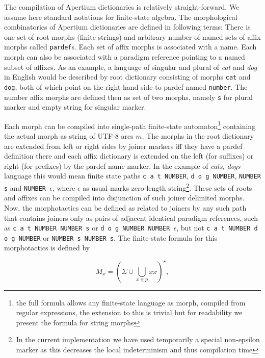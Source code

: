 \documentclass[a4paper]{article}
\begin{document}
The compilation of Apertium dictionaries is relatively straight-forward. We
assume here standard notations for finite-state algebra. The morphological
combinatorics of Apertium dictionaries are defined in following terms: There is
one set of root morphs (finite strings) and arbitrary number of named sets of
affix morphs called {\tt pardef}s. Each set of affix morphs is associated with a
name. Each morph can also be associated with a paradigm reference pointing to a
named subset of affixes. As an example, a language of singular and plural of
\emph{cat} and \emph{dog} in English would be described by root dictionary
consisting of morphs \texttt{cat} and \texttt{dog}, both of which point on the
right-hand side to pardef named \texttt{number}. The number affix morphs are
defined then as set of two morphs, namely \texttt{s} for plural marker and
empty string for singular marker.

Each morph can be compiled into single-path finite-state automaton\footnote{the
full formula allows any finite-state language as morph, compiled from regular
expressions, the extension to this is trivial but for readability we present
the formula for string morphs} containing the actual morph as string of UTF-8
arcs $m$. The morphs in the root dictionary are extended from left or right
sides by joiner markers iff they have a pardef definition there and each affix
dictionary is extended on the left (for suffixes) or right (for prefixes) by
the pardef name marker. In the example of \emph{cats, dogs} language this would
mean finite state paths \texttt{c a t NUMBER}, \texttt{d o g NUMBER},
\texttt{NUMBER s} and \texttt{NUMBER $\epsilon$}, where $\epsilon$ as usual
marks zero-length string\footnote{In the current implementation we have used
temporarily a special non-epsilon marker as this decreases the local
indeterminism and thus compilation time}.  These sets of roots and affixes can
be compiled into disjunction of such joiner delimited morphs.  Now, the
morphotactics can be defined as related to joiners by any such path that
contains joiners only as pairs of adjacent identical paradigm references, such
as \texttt{c a t NUMBER NUMBER s} or \texttt{d o g NUMBER NUMBER $\epsilon$},
but not \texttt{c a t NUMBER d o g NUMBER} or \texttt{NUMBER s NUMBER s}. The
finite-state formula for this morphotactics is defined by

\begin{equation}\label{formula:morphotax}
 M_x = (\Sigma \cup \bigcup_{x \in p} x x)^{\star},
\end{equation}
\end{document}
